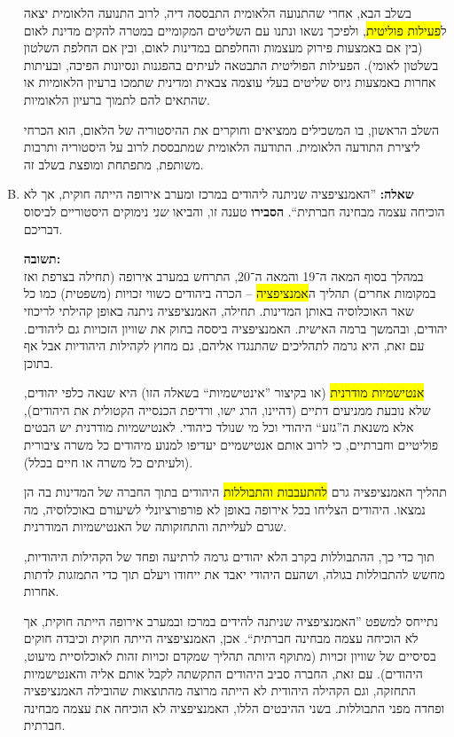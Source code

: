 \documentclass[a4paper]{article}
\newcommand\hl[1]   {\colorbox{yellow}{\!\!#1\!\!}}
\begin{document}
\begin{enumerate}[A.]
			בשלב הבא, אחרי שהתנועה הלאומית התבססה דיה, לרוב התנועה הלאומית יצאה ל\hl{פעילות פוליטית}, ולפיכך נשאו ונתנו עם השליטים המקומיים במטרה להקים מדינת לאום (בין אם באמצעות פירוק מעצמות והחלפתם במדינות לאום, ובין אם החלפת השלטון בשלטון לאומי). הפעילות הפוליטית התבטאה לעיתים בהפגנות ונסיונות הפיכה, ובעיתות אחרות באמצעות גיוס שליטים בעלי עוצמה צבאית ומדינית שתמכו ברעיון הלאומיות או שהתאים להם לתמוך ברעיון הלאומיות. 
			
			השלב הראשון, בו המשכילים ממציאים וחוקרים את ההיסטוריה של הלאום, הוא הכרחי ליצירת התודעה הלאומית. התודעה הלאומית שמתבססת לרוב על היסטוריה ותרבות משותפת, מתפתחת ומופצת בשלב זה. 
			
			\item \textbf{שאלה: }''האמנציפציה שניתנה ליהודים במרכז ומערב אירופה הייתה חוקית, אך לא הוכיחה עצמה מבחינה חברתית``. \textbf{הסבירו} טענה זו, והביאו \textit{שני} נימוקים היסטוריים לביסוס דבריכם. 
			
			\textbf{תשובה: }\\
			במהלך בסוף המאה ה־19 והמאה ה־20, התרחש במערב אירופה (תחילה בצרפת ואז במקומות אחרים) תהליך ה\hl{אמנציפציה} – הכרה ביהודים כשווי זכויות (משפטית) כמו כל שאר האוכלוסיה באותן המדינות. תחילה, האמנציפציה ניתנה באופן קהילתי לריכוזי יהודים, ובהמשך ברמה האישית. האמנציפציה ביססה בחוק את שוויון הזכויות גם ליהודים. עם זאת, היא גרמה לתהליכים שהתנגדו אליהם, גם מחוץ לקהילות היהודיות אבל אף בתוכן. 
			
			\hl{אנטישמיות מודרנית} (או בקיצור ''אינטישמיות`` בשאלה הזו) היא שנאה כלפי יהודים, שלא נובעת ממניעים דתיים (דהיינו, הרג ישו, ורדיפת הכנסייה הקטולית את היהודים), אלא משנאת ה''גזע`` היהודי וכל מי שנולד כיהודי. לאנטישמיות מודרנית יש הבטים פוליטיים וחברתיים, כי לרוב אותם אנטישמיים יעדיפו למנוע מיהודים כל משרה ציבורית (ולעיתים כל משרה או חיים בכלל). 
			
			תהליך האמנציפציה גרם \hl{להתעבבות והתבוללות} היהודים בתוך החברה של המדינות בה הן נמצאו. היהודים הצליחו בכל אירופה באופן לא פורפורציונלי לשיעורם באוכלוסיה, מה שגרם לעלייתה והתחזקותה של האנטישמיות המודרנית. 
			
			תוך כדי כך, ההתבוללות בקרב הלא יהודים גרמה לרתיעה ופחד של הקהילות היהודיות, מחשש להתבוללות בגולה, ושהעם היהודי יאבד את ייחודו ויעלם תוך כדי התמזגות לדתות אחרות. 
			
			נתייחס למשפט ''האמנציפציה שניתנה להידים במרכז ובמערב אירופה הייתה חוקית, אך לא הוכיחה עצמה מבחינה חברתית``. אכן, האמנציפציה הייתה חוקית וכיבדה חוקים בסיסיים של שוויון זכויות (מתוקף היותה תהליך שמקדם זכויות זהות לאוכלוסיית מיעוט, היהודים). עם זאת, החברה סביב היהודים התקשתה לקבל אותם אליה והאנטישמיות התחזקה, וגם הקהילה היהודית לא הייתה מרוצה מהתוצאות שהובילה האמנציפציה ופחדה מפני התבוללות. בשני ההיבטים הללו, האמנציפציה לא הוכיחה את עצמה מבחינה חברתית. 
			
		\end{enumerate}
\end{document}
